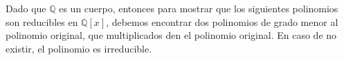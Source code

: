 Dado que $\mathbb Q$ es un cuerpo, entonces para mostrar que los siguientes polinomios son reducibles en $\mathbb Q[x]$, debemos encontrar dos polinomios de grado menor al polinomio original, que multiplicados den el polinomio original. En caso de no existir, el polinomio es irreducible.